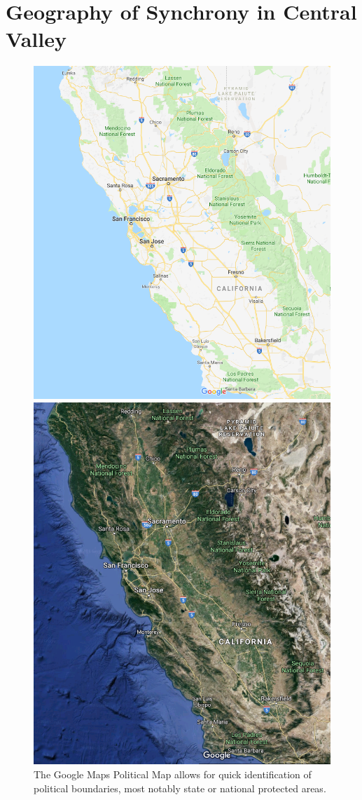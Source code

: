 \documentclass[11pt,reqno, twoside]{amsart}
\theoremstyle{plain}  %
\theoremstyle{definition}
\numberwithin{figure}{section}
\numberwithin{equation}{section}
\begin{document}
\section{Geography of Synchrony in Central Valley}
\begin{figure}[ht] 
  \label{CentralValleyMaps} 
  \begin{minipage}[b]{0.5\linewidth}
    \centering
    \includegraphics[width=.8\linewidth]{images/CentralValleyPoliticalMap.png} 
    \caption{The Google Maps Political Map allows for quick identification of political boundaries, most notably state or national protected areas.} 
    \vspace{4ex}
  \end{minipage}%
  \begin{minipage}[b]{0.5\linewidth}
    \centering
    \includegraphics[width=.8\linewidth]{images/CentralValleySatelliteMap.png} 

\end{minipage}
\end{figure}
\end{document}
